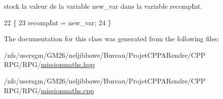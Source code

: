 stock la valeur de la variable new\-\_\-var dans la variable recomp\-Int. 


\begin{DoxyCode}
22                                                  \{
23       recompInt = new\_var;
24   \}
\end{DoxyCode}


The documentation for this class was generated from the following files\-:\begin{DoxyCompactItemize}
\item 
/nfs/usersgm/\-G\-M26/neljibbawe/\-Bureau/\-Projet\-C\-P\-P\-A\-Rendre/\-C\-P\-P R\-P\-G/\-R\-P\-G/\hyperlink{missionmaths_8hpp}{missionmaths.\-hpp}\item 
/nfs/usersgm/\-G\-M26/neljibbawe/\-Bureau/\-Projet\-C\-P\-P\-A\-Rendre/\-C\-P\-P R\-P\-G/\-R\-P\-G/\hyperlink{missionmaths_8cpp}{missionmaths.\-cpp}\end{DoxyCompactItemize}
